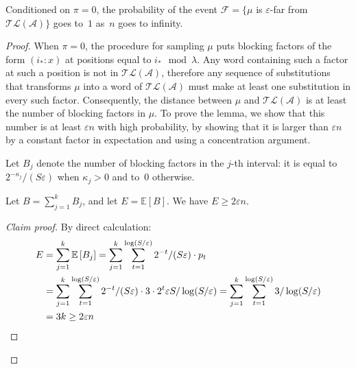 \documentclass[letterpaper, USenglish, cleveref, autoref, thm-restate, numberwithinsect]{lipics-v2021}
\theoremstyle{theorem}
\theoremstyle{definition}
\newcommand{\Aa}{\mathcal{A}}
\newcommand{\EE}{\mathbb{E}}
\newcommand{\eps}{\varepsilon}
\newcommand{\Ff}{\mathcal{F}}
\newcommand{\timedlang}[1]{\mathcal{TL}( #1 )}
\newcommand{\timedword}[2]{(#1:#2)}
\begin{document}
\begin{lemma}\label{lemma:far-whp}
    Conditioned on $\pi = 0$, the probability of the event $\Ff = \{ \mu$ is $\eps$-far from $\timedlang{\Aa} \}$ goes to~$1$ as~$n$ goes to infinity.
\end{lemma}
\begin{proof}
    When $\pi = 0$, the procedure for sampling $\mu$ puts blocking factors of the form $\timedword{i_*}{x}$ at positions equal to $i_* \mod \lambda$. Any word containing such a factor at such a position is not in $\timedlang{\Aa}$, therefore any sequence of substitutions that transforms $\mu$ into a word of $\timedlang{\Aa}$ must make at least one substitution in every such factor.
    Consequently, the distance between $\mu$ and $\timedlang{\Aa}$ is at least the number of blocking factors in $\mu$. To prove the lemma, we show that this number is at least $\eps n$ with high probability, by showing that it is larger than $\eps n$ by a constant factor in expectation and using a concentration argument.

    Let $B_j$ denote the number of blocking factors in the $j$-th interval: it is equal to $2^{-\kappa_j}/( S\eps)$ when $\kappa_j>0$ and to~$0$ otherwise.
    
    \begin{claim}\label{claim:expe}
        Let $B = \sum_{j=1}^{k} B_j$, and let $E = \EE\left[B\right]$.
        We have $E \ge 2\eps n$.
    \end{claim}
    \begin{proof}[Claim proof]
        By direct calculation:
        \begin{align*}
            E &= \sum_{j=1}^{k}\EE\left[ B_j\right]= \sum_{j=1}^{k}\sum_{t= 1}^{\log( S/\eps)} 2^{-t}/( S\eps) \cdot p_t\\
                &= \sum_{j=1}^{k}\sum_{t= 1}^{\log( S/\eps)} 2^{-t}/( S\eps)\cdot  3\cdot2^t\eps S/\log( S/\eps) = \sum_{j=1}^{k}\sum_{t= 1}^{\log( S/\eps)} 3/\log( S/\eps)\\
                &= 3k \ge 2\eps n\qedhere
        \end{align*}
    \end{proof}


\end{proof}
\end{document}
